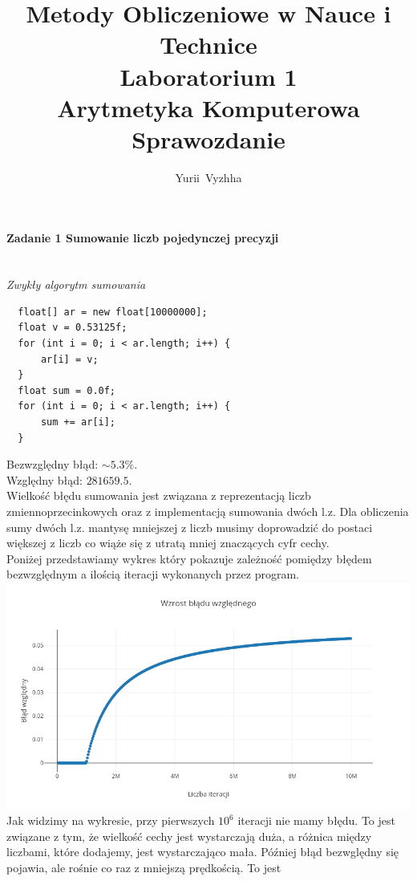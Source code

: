 \documentclass[12pt,a4paper]{article}
\author{Yurii~Vyzhha}
\title{Metody Obliczeniowe w Nauce i Technice \\ Laboratorium 1 \\
  Arytmetyka Komputerowa \\ Sprawozdanie}
\begin{document}
  \maketitle
  \paragraph{Zadanie 1 Sumowanie liczb pojedynczej precyzji}\mbox{}\vspace{3mm}\\
  \emph{Zwykły algorytm sumowania}
  \begin{Verbatim}
  float[] ar = new float[10000000];
  float v = 0.53125f;
  for (int i = 0; i < ar.length; i++) {
      ar[i] = v;
  }
  float sum = 0.0f;
  for (int i = 0; i < ar.length; i++) {
      sum += ar[i];
  }
  \end{Verbatim}
  Bezwzględny błąd: $ \sim 5.3 \%$. \\
  Względny błąd: $ 281659.5$. \\
  Wielkość błędu sumowania jest związana z reprezentacją liczb
  zmiennoprzecinkowych oraz z implementacją sumowania dwóch l.z.
  Dla obliczenia sumy dwóch l.z. mantysę mniejszej z liczb musimy doprowadzić
  do postaci większej z liczb co wiąże się z utratą mniej znaczących cyfr
  cechy. \\
  Poniżej przedstawiamy wykres który pokazuje zależność pomiędzy błędem
  bezwzględnym a ilością iteracji wykonanych przez program.\\
  \includegraphics[width=1\textwidth]{img/Plot1} \\
  Jak widzimy na wykresie, przy pierwszych $10^6$ iteracji nie mamy błędu.
  To jest związane z tym, że wielkość cechy jest wystarczają duża, a różnica
  między liczbami, które dodajemy, jest wystarczająco mała. Później błąd
  bezwględny się pojawia, ale rośnie co raz z mniejszą prędkością. To jest
\end{document}
